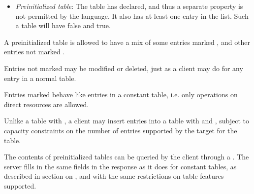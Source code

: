 \documentclass[11pt]{article}
\begin{document}
{\begin{itemize}[noitemsep,topsep=\mdcompacttopsep]
\item{}\emph{Preinitialized table}: The table has  declared, and thus a
separate  property is not permitted by the language.
It also has at least one entry in the list.  Such a table will have
 false and  true.%
\end{itemize}%

\noindent{}A preinitialized table is allowed to have a mix of some entries marked
, and other entries not marked .%

Entries not marked  may be modified or deleted, just as a
client may do for any entry in a normal table.%

Entries marked  behave like entries in a constant table,
i.e. only  operations on direct resources are allowed.%

Unlike a table with , a client may insert
entries into a table with  and
, subject to capacity constraints on the
number of entries supported by the target for the table.%

The contents of preinitialized tables can be queried by the client
through a .  The server fills in the same fields in the
response as it does for constant tables, as described in section on
, and with the same restrictions on table
features supported.%

}
\end{document}
